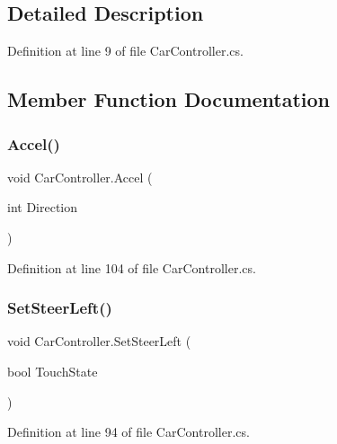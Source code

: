 \subsection{Detailed Description}


Definition at line 9 of file Car\+Controller.\+cs.



\subsection{Member Function Documentation}
\mbox{\label{class_car_controller_aea7ff289a093f7d8a82a4d0729663670}} 
\subsubsection{\texorpdfstring{Accel()}{Accel()}}
{\footnotesize\ttfamily void Car\+Controller.\+Accel (\begin{DoxyParamCaption}\item[{int}]{Direction }\end{DoxyParamCaption})\hspace{0.3cm}{\ttfamily [inline]}}



Definition at line 104 of file Car\+Controller.\+cs.

\mbox{\label{class_car_controller_a4471840e4b414d910130d59abe66c2c4}} 
\subsubsection{\texorpdfstring{Set\+Steer\+Left()}{SetSteerLeft()}}
{\footnotesize\ttfamily void Car\+Controller.\+Set\+Steer\+Left (\begin{DoxyParamCaption}\item[{bool}]{Touch\+State }\end{DoxyParamCaption})\hspace{0.3cm}{\ttfamily [inline]}}



Definition at line 94 of file Car\+Controller.\+cs.

\mbox{\label{class_car_controller_a05b7db4b3d87ffa872a811ec4f5e3ef1}} 
